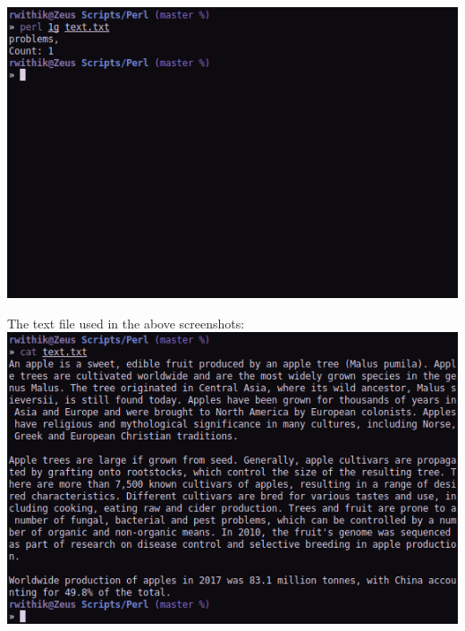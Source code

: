 \documentclass[10pt,a4paper,titlepage]{report}
\begin{document}
\begin{enumerate}
	\includegraphics[width=\linewidth]{../Images/Perl/1g.png}
\end{enumerate}
\pagebreak
\par The text file used in the above screenshots:\newline\newline
\includegraphics[width=\linewidth]{../Images/Perl/perl_text.png}
\end{document}
